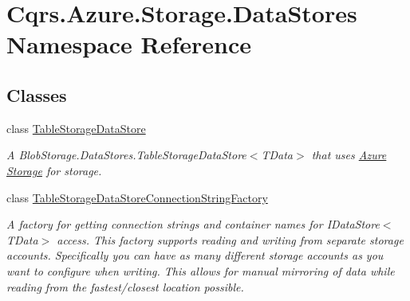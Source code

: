 \hypertarget{namespaceCqrs_1_1Azure_1_1Storage_1_1DataStores}{}\section{Cqrs.\+Azure.\+Storage.\+Data\+Stores Namespace Reference}
\label{namespaceCqrs_1_1Azure_1_1Storage_1_1DataStores}
\subsection*{Classes}
\begin{DoxyCompactItemize}
\item 
class \hyperlink{classCqrs_1_1Azure_1_1Storage_1_1DataStores_1_1TableStorageDataStore}{Table\+Storage\+Data\+Store}
\begin{DoxyCompactList}\small\item\em A Blob\+Storage.\+Data\+Stores.\+Table\+Storage\+Data\+Store$<$\+T\+Data$>$ that uses \hyperlink{namespaceCqrs_1_1Azure}{Azure} \hyperlink{namespaceCqrs_1_1Azure_1_1Storage}{Storage} for storage. \end{DoxyCompactList}\item 
class \hyperlink{classCqrs_1_1Azure_1_1Storage_1_1DataStores_1_1TableStorageDataStoreConnectionStringFactory}{Table\+Storage\+Data\+Store\+Connection\+String\+Factory}
\begin{DoxyCompactList}\small\item\em A factory for getting connection strings and container names for I\+Data\+Store$<$\+T\+Data$>$ access. This factory supports reading and writing from separate storage accounts. Specifically you can have as many different storage accounts as you want to configure when writing. This allows for manual mirroring of data while reading from the fastest/closest location possible. \end{DoxyCompactList}\end{DoxyCompactItemize}

